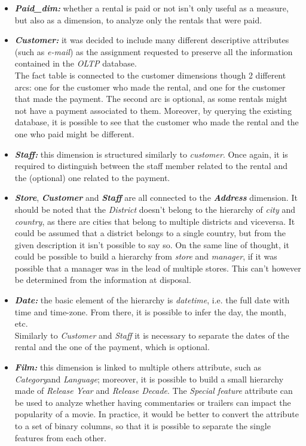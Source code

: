 \documentclass[
10pt,
a4paper,
oneside,
headinclude,
footinclude]{article}
\begin{document}
\begin{itemize}
    \item \textbf{\textit{Paid\_dim:}} whether a rental is paid or not isn't only useful as a measure, but also as a dimension, to analyze only the rentals that were paid.
    \item \textbf{\textit{Customer:}} it was decided to include many different descriptive attributes (such as \textit{e-mail}) as the assignment requested to preserve all the information contained in the \textit{OLTP} database.\\
        The fact table is connected to the customer dimensions though 2 different arcs: one for the customer who made the rental, and one for the customer that made the payment. The second arc is optional, as some rentals might not have a payment associated to them. Moreover, by querying the existing database, it is possible to see that the customer who made the rental and the one who paid might be different.
    \item \textbf{\textit{Staff:}} this dimension is structured similarly to \textit{customer}. Once again, it is required to distinguish between the staff member related to the rental and the (optional) one related to the payment.
    \item \textbf{\textit{Store}}, \textbf{\textit{Customer}} and \textbf{\textit{Staff}} are all connected to the \textbf{\textit{Address}} dimension.
        It should be noted that the \textit{District} doesn't belong to the hierarchy of \textit{city} and \textit{country}, as there are cities that belong to multiple districts and viceversa. It could be assumed that a district belongs to a single country, but from the given description it isn't possible to say so.
        On the same line of thought, it could be possible to build a hierarchy from \textit{store} and \textit{manager}, if it was possible that a manager was in the lead of multiple stores. This can't however be determined from the information at disposal.
     \item \textbf{\textit{Date:}} the basic element of the hierarchy is \textit{datetime}, i.e. the full date with time and time-zone. From there, it is possible to infer the day, the month, etc.\\
         Similarly to \textit{Customer} and \textit{Staff} it is necessary to separate the dates of the rental and the one of the payment, which is optional.
     \item \textbf{\textit{Film:}} this dimension is linked to multiple others attribute, such as \textit{Category}and \textit{Language}; moreover, it is possible to build a small hierarchy made of \textit{Release Year} and \textit{Release Decade}. The \textit{Special feature} attribute can be used to analyze whether having commentaries or trailers can impact the popularity of a movie. In practice, it would be better to convert the attribute to a set of binary columns, so that it is possible to separate the single features from each other. \\

\end{itemize}
\end{document}
